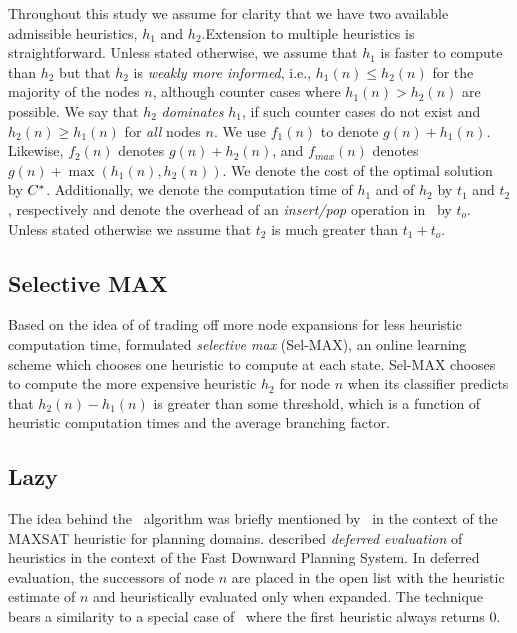 Throughout this study we assume for clarity that we have two available
admissible heuristics, $h_1$ and $h_2$.Extension to multiple heuristics is straightforward.
Unless stated otherwise, we assume that $h_1$ is faster to compute than $h_2$
but that $h_2$ is {\em weakly more informed}, i.e., $h_1(n) \leq h_2(n)$ for
the majority of the nodes $n$, although counter cases where $h_1(n) > h_2(n)$
are possible. We say that $h_2$ {\em dominates} $h_1$, if such counter cases do not
exist and $h_2(n) \geq h_1(n)$ for {\em all} nodes $n$.
We use $f_1(n)$ to denote $g(n)+h_1(n)$. Likewise, $f_2(n)$
denotes $g(n)+h_2(n)$, and $f_{max}(n)$ denotes $g(n) + \max(h_1(n),h_2(n))$.
We denote the cost of the optimal solution by $C^\ast$. Additionally, we
denote the computation time of $h_1$ and of $h_2$ by $t_1$ and $t_2$,
respectively and denote the overhead of an {\em insert/pop} operation in
\OPEN~by $t_o$. Unless stated otherwise we assume that $t_2$ is much greater
than $t_1 + t_o$. 

\subsection{Selective MAX}

Based on the idea of of trading off more node expansions for less
heuristic computation time, \cite{domshlak-et-al:jair-2012} formulated
{\em selective max} (Sel-MAX), an online learning scheme which chooses
one heuristic to compute at each state. Sel-MAX chooses to compute the
more expensive heuristic $h_2$ for node $n$ when its classifier
predicts that $h_2(n) - h_1(n)$ is greater than some threshold, which
is a function of heuristic computation times and the average branching
factor.

\subsection{Lazy \astar}

The idea behind the \lazyastar~algorithm was briefly mentioned
by~\cite{zhang-bacchus:aaai-2012} in the context of the MAXSAT
heuristic for planning domains. \cite{Helmert.fdps} described
\emph{deferred evaluation} of heuristics in the context of the Fast
Downward Planning System. In deferred evaluation, the successors of
node $n$ are placed in the open list with the heuristic estimate of
$n$ and heuristically evaluated only when expanded.  The technique
bears a similarity to a special case of \lazyastar~where the first
heuristic always returns 0.

